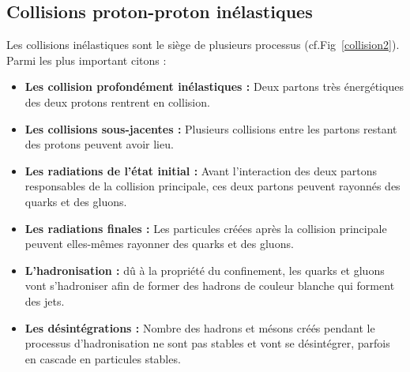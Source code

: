 \subsection{Collisions proton-proton inélastiques}
Les collisions inélastiques sont le siège de plusieurs processus (cf.Fig~\ref{collision2}). Parmi les plus important citons :
\begin{itemize}[label=$\bullet$]
	\item \textbf{Les collision profondément inélastiques :} Deux partons très énergétiques des deux protons rentrent en collision.
	\item \textbf{Les collisions sous-jacentes :} Plusieurs collisions entre les partons restant des protons peuvent avoir lieu.
	\item \textbf{Les radiations de l'état initial :} Avant l'interaction des deux partons responsables de la collision principale, ces deux partons peuvent rayonnés des quarks et des gluons.
	\item \textbf{Les radiations finales :} Les particules créées après la collision principale peuvent elles-mêmes rayonner des quarks et des gluons.
	\item \textbf{L'hadronisation :} dû à la propriété du confinement, les quarks et gluons vont s'hadroniser afin de former des hadrons de couleur blanche qui forment des jets.
	\item \textbf{Les désintégrations :} Nombre des hadrons et mésons créés pendant le processus d'hadronisation ne sont pas stables et vont se désintégrer, parfois en cascade en particules stables.
\end{itemize}

